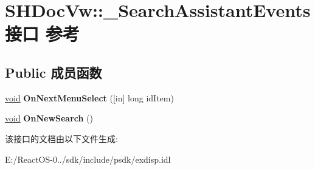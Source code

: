 \hypertarget{interface_s_h_doc_vw_1_1___search_assistant_events}{}\section{S\+H\+Doc\+Vw\+:\+:\+\_\+\+Search\+Assistant\+Events接口 参考}
\label{interface_s_h_doc_vw_1_1___search_assistant_events}
\subsection*{Public 成员函数}
\begin{DoxyCompactItemize}
\item 
\mbox{\label{interface_s_h_doc_vw_1_1___search_assistant_events_a98bf5f425569fa0a754f3797f344ece4}} 
\hyperlink{interfacevoid}{void} {\bfseries On\+Next\+Menu\+Select} (\mbox{[}in\mbox{]} long id\+Item)
\item 
\mbox{\label{interface_s_h_doc_vw_1_1___search_assistant_events_a62480f583915a739c0c370288c3e3b80}} 
\hyperlink{interfacevoid}{void} {\bfseries On\+New\+Search} ()
\end{DoxyCompactItemize}


该接口的文档由以下文件生成\+:\begin{DoxyCompactItemize}
\item 
E\+:/\+React\+O\+S-\/0../sdk/include/psdk/exdisp.\+idl\end{DoxyCompactItemize}

